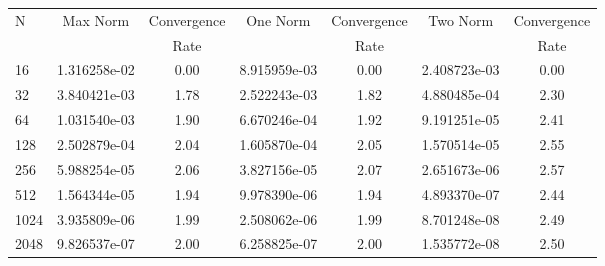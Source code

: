 \documentclass[12pt]{article}
\begin{document}
	\begin{tabular}{l|c|c|c|c|c|c}
		N&Max Norm&Convergence&One Norm&Convergence&Two Norm&Convergence\\
		&&Rate&&Rate&&Rate\\
		\hline
		16&1.316258e-02&0.00&8.915959e-03&0.00&2.408723e-03&0.00\\
		\hline
		32&3.840421e-03&1.78&2.522243e-03&1.82&4.880485e-04&2.30\\
		\hline
		64&1.031540e-03&1.90&6.670246e-04&1.92&9.191251e-05&2.41\\
		\hline
		128&2.502879e-04&2.04&1.605870e-04&2.05&1.570514e-05&2.55\\
		\hline
		256&5.988254e-05&2.06&3.827156e-05&2.07&2.651673e-06&2.57\\
		\hline
		512&1.564344e-05&1.94&9.978390e-06&1.94&4.893370e-07&2.44\\
		\hline
		1024&3.935809e-06&1.99&2.508062e-06&1.99&8.701248e-08&2.49\\
		\hline
		2048&9.826537e-07&2.00&6.258825e-07&2.00&1.535772e-08&2.50\\
	\end{tabular}
\end{document}
